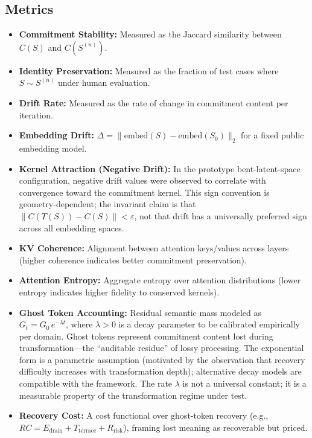 \documentclass[11pt,a4paper]{article}
\begin{document}
\subsection{Metrics}

\begin{itemize}
    \item \textbf{Commitment Stability:} Measured as the Jaccard similarity between $C(S)$ and $C(S^{(n)})$.
    \item \textbf{Identity Preservation:} Measured as the fraction of test cases where $S \sim S^{(n)}$ under human evaluation.
    \item \textbf{Drift Rate:} Measured as the rate of change in commitment content per iteration.
    \item \textbf{Embedding Drift:} $\Delta = \| \mathrm{embed}(S) - \mathrm{embed}(S_0) \|_2$ for a fixed public embedding model.
    \item \textbf{Kernel Attraction (Negative Drift):} In the prototype bent-latent-space configuration, negative drift values were observed to correlate with convergence toward the commitment kernel. This sign convention is geometry-dependent; the invariant claim is that $\| C(T(S)) - C(S) \| < \varepsilon$, not that drift has a universally preferred sign across all embedding spaces.
    \item \textbf{KV Coherence:} Alignment between attention keys/values across layers (higher coherence indicates better commitment preservation).
    \item \textbf{Attention Entropy:} Aggregate entropy over attention distributions (lower entropy indicates higher fidelity to conserved kernels).
    \item \textbf{Ghost Token Accounting:} Residual semantic mass modeled as $G_t = G_0 \, e^{-\lambda t}$, where $\lambda > 0$ is a decay parameter to be calibrated empirically per domain. Ghost tokens represent commitment content lost during transformation---the ``auditable residue'' of lossy processing. The exponential form is a parametric assumption (motivated by the observation that recovery difficulty increases with transformation depth); alternative decay models are compatible with the framework. The rate $\lambda$ is not a universal constant; it is a measurable property of the transformation regime under test.
    \item \textbf{Recovery Cost:} A cost functional over ghost-token recovery (e.g., $RC = E_{\text{drain}} + T_{\text{terrace}} + R_{\text{risk}}$), framing lost meaning as recoverable but priced.
\end{itemize}
\end{document}
